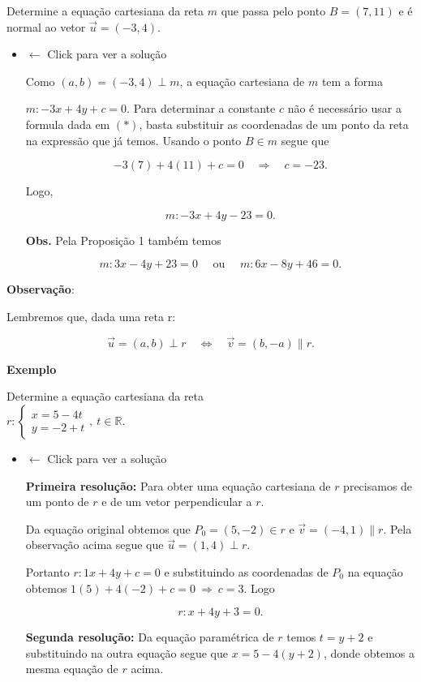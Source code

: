 \documentclass[
  brazilian,
  letterpaper,
  DIV=11,
  numbers=noendperiod]{scrreprt}
\theoremstyle{definition}
\theoremstyle{plain}
\theoremstyle{definition}
\theoremstyle{remark}
\begin{document}
Determine a equação cartesiana da reta \(m\) que passa pelo ponto
\(B = (7, 11)\) e é normal ao vetor \(\vec{u} = (-3, 4)\).

\begin{itemize}
\item
  \(\leftarrow\) Click para ver a solução

  Como \((a,b)=(-3,4) \perp m\), a equação cartesiana de \(m\) tem a
  forma

  \(m: -3x+4y+c=0\). Para determinar a constante \(c\) não é necessário
  usar a formula dada em \((\ast)\), basta substituir as coordenadas de
  um ponto da reta na expressão que já temos. Usando o ponto \(B \in m\)
  segue que

  \[
    -3(7) + 4(11) + c=0 \quad  \Rightarrow \quad  c=-23.
    \]

  Logo,

  \[
     m: -3x+4y-23=0.
    \]

  \textbf{Obs.} Pela Proposição 1 também temos

  \[
     m: 3x - 4y+ 23=0 \quad \text{ ou } \quad  m: 6x - 8y+ 46=0.
    \]
\end{itemize}

\textbf{Observação}:

Lembremos que, dada uma reta r:

\[
\vec{u} = (a, b) \perp r \quad \Leftrightarrow \quad \vec{v} = (b,-a) \parallel r.
\]

\textbf{Exemplo}

Determine a equação cartesiana da reta\\
\(r: \left\lbrace
\begin{array}{l}
x = 5 - 4t \\
y = -2 + t
\end{array}
\right.,\ t \in \mathbb{R}.\)

\begin{itemize}
\item
  \(\leftarrow\) Click para ver a solução

  \textbf{Primeira resolução:} Para obter uma equação cartesiana de
  \(r\) precisamos de um ponto de \(r\) e de um vetor perpendicular a
  \(r\).

  Da equação original obtemos que \(P_0 = (5,-2) \in r\) e
  \(\vec{v}=(-4,1)\parallel r\). Pela observação acima segue que
  \(\vec{u}=(1,4) \perp r\).

  Portanto \(r:1x+4y+c=0\) e substituindo as coordenadas de \(P_0\) na
  equação obtemos \(1(5)+4(-2) + c=0 \ \Rightarrow \ c=3\). Logo

  \[
    r: x+4y+3=0.
    \]

  \textbf{Segunda resolução:} Da equação paramétrica de \(r\) temos
  \(t=y+2\) e substituindo na outra equação segue que \(x= 5 - 4(y+2)\),
  donde obtemos a mesma equação de \(r\) acima.
\end{itemize}
\end{document}
